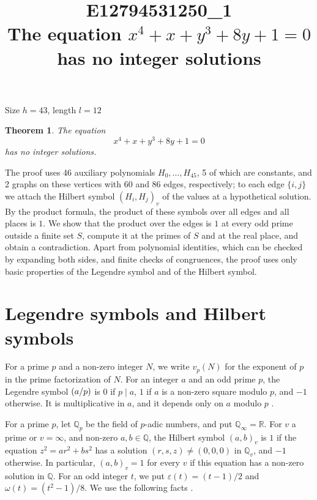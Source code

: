 \documentclass[11pt]{article}
\title{\textbf{E12794531250\_1}\\[4pt] {\Large The equation $x^{4}+x+y^{3}+8y+1=0$ has no integer solutions}}
\author{}
\date{}
\newtheorem{theorem}{Theorem}
\newcommand{\Q}{\mathbb{Q}}
\newcommand{\leg}[2]{\mathchoice{\biggl(\dfrac{#1}{#2}\biggr)}{(#1/#2)}{(#1/#2)}{(#1/#2)}}
\begin{document}
\maketitle
\vspace{-8ex}
\begin{center}
Size $h=43$, length $l=12$
\end{center}

\begin{theorem}\label{thm:main}
The equation
\begin{equation}\label{eq:main}
x^{4}+x+y^{3}+8y+1=0
\end{equation}
has no integer solutions.
\end{theorem}

The proof uses 46 auxiliary polynomials $H_0,\dots,H_{45}$, 5 of which are constants, and 2 graphs on these vertices with 60 and 86 edges, respectively; to each edge $\{i,j\}$ we attach the Hilbert symbol $(H_i,H_j)_v$ of the values at a hypothetical solution. By the product formula, the product of these symbols over all edges and all places is $1$. We show that the product over the edges is $1$ at every odd prime outside a finite set $S$, compute it at the primes of $S$ and at the real place, and obtain a contradiction. Apart from polynomial identities, which can be checked by expanding both sides, and finite checks of congruences, the proof uses only basic properties of the Legendre symbol and of the Hilbert symbol.

\section{Legendre symbols and Hilbert symbols}

For a prime $p$ and a non-zero integer $N$, we write $v_p(N)$ for the exponent of $p$ in the prime factorization of $N$. For an integer $a$ and an odd prime $p$, the Legendre symbol $\leg{a}{p}$ is $0$ if $p\mid a$, $1$ if $a$ is a non-zero square modulo $p$, and $-1$ otherwise. It is multiplicative in $a$, and it depends only on $a$ modulo $p$ \cite[Chapter~5]{IR}.

For a prime $p$, let $\Q_p$ be the field of $p$-adic numbers, and put $\Q_\infty=\mathbb R$. For $v$ a prime or $v=\infty$, and non-zero $a,b\in\Q$, the Hilbert symbol $(a,b)_v$ is $1$ if the equation $z^2=ar^2+bs^2$ has a solution $(r,s,z)\neq(0,0,0)$ in $\Q_v$, and $-1$ otherwise. In particular, $(a,b)_v=1$ for every $v$ if this equation has a non-zero solution in $\Q$. For an odd integer $t$, we put $\varepsilon(t)=(t-1)/2$ and $\omega(t)=(t^2-1)/8$. We use the following facts \cite[Chapter~III, Proposition~2 and Theorems~1 and~3]{Se}.
\end{document}
